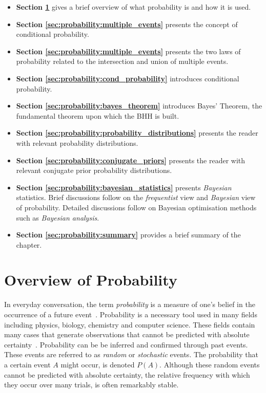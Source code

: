 \begin{itemize}
      \item \textbf{Section \ref{sec:probability:overview}} gives a brief overview of what probability is and how it is used.

      \item \textbf{Section \ref{sec:probability:multiple_events}} presents the concept of conditional probability.

      \item \textbf{Section \ref{sec:probability:multiple_events}} presents the two laws of probability related to the intersection and union of multiple events.

      \item \textbf{Section \ref{sec:probability:cond_probability}} introduces conditional probability.

      \item \textbf{Section \ref{sec:probability:bayes_theorem}} introduces Bayes' Theorem, the fundamental theorem upon which the \acs{BHH} is built.

      \item \textbf{Section \ref{sec:probability:probability_distributions}} presents the reader with relevant probability distributions.

      \item \textbf{Section \ref{sec:probability:conjugate_priors}} presents the reader with relevant conjugate prior probability distributions.

      \item \textbf{Section \ref{sec:probability:bayesian_statistics}} presents \textit{Bayesian} statistics. Brief discussions follow on the \textit{frequentist} view and \textit{Bayesian} view of probability. Detailed discussions follow on Bayesian optimisation methods such as \textit{Bayesian analysis}.

      \item \textbf{Section \ref{sec:probability:summary}} provides a brief summary of the chapter.
\end{itemize}


\section{Overview of Probability}\label{sec:probability:overview}

In everyday conversation, the term \textit{probability} is a measure of one's belief in the occurrence of a future event~\cite{ref:wackerly:2014}. Probability is a necessary tool used in many fields including physics, biology, chemistry and computer science. These fields contain many cases that generate observations that cannot be predicted with absolute certainty~\cite{ref:wackerly:2014}. Probability can be be inferred and confirmed through past events. These events are referred to as \textit{random} or \textit{stochastic} events. The probability that a certain event $A$ might occur, is denoted $P(A)$. Although these random events cannot be predicted with absolute certainty, the relative frequency with which they occur over many trials, is often remarkably stable.

